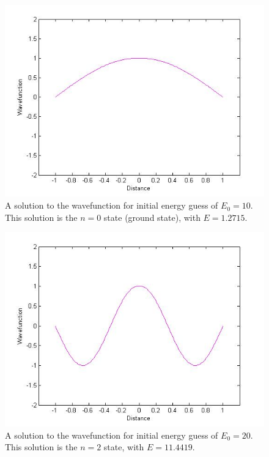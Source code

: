\documentclass[12pt]{article}                  %
\begin{document}
\begin{figure}[H]
\centering
\includegraphics[scale=0.45]{aogle_final_n_0.jpg}
\caption{A solution to the wavefunction for initial energy guess of $E_{0} = 10$. This solution is the $n = 0$ state (ground state), with $E = 1.2715$.}
\label{wavefunction n = 0}
\end{figure}

\begin{figure}[H]
\centering
\includegraphics[scale=0.45]{aogle_final_n_2.jpg}
\caption{A solution to the wavefunction for initial energy guess of $E_{0} = 20$. This solution is the $n = 2$ state, with $E = 11.4419$.}
\label{wavefunction n = 2}
\end{figure}
\end{document}
